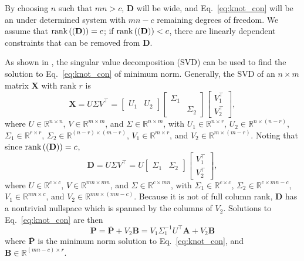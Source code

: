 By choosing $n$ such that $mn > c$, $\mathbf{D}$ will be wide, and Eq.~\ref{eq:knot_con} will be an under determined system with $mn - c$ remaining degrees of freedom.
We assume that $\text{rank}\left((\mathbf{D})\right) = c$; if $\text{rank}\left((\mathbf{D})\right) < c$, there are linearly dependent constraints that can be removed from $\mathbf{D}$.

As shown in \cite{MoonStirling00}, the singular value decomposition (SVD)
can be used to find the solution to Eq.~\ref{eq:knot_con} of minimum norm.
Generally, the SVD of an $n \times m$ matrix $\mathbf{X}$ with rank $r$ is 
\begin{equation}
	\mathbf{X} = U \Sigma V^\top = 
	\begin{bmatrix} U_1 & U_2 \end{bmatrix} 
	\begin{bmatrix} \Sigma_1 & \\ & \Sigma_2 \end{bmatrix} 
	\begin{bmatrix} V_1^\top \\ V_2^\top \end{bmatrix},
	\label{eq:D_svd}
\end{equation}
where $U \in \mathbb{R}^{n \times n}$, $V \in \mathbb{R}^{m \times m}$, and $\Sigma \in \mathbb{R}^{n \times m}$, with
$U_1 \in \mathbb{R}^{n \times r}$, $U_2 \in \mathbb{R}^{n \times (n-r)}$,
$\Sigma_1 \in \mathbb{R}^{r \times r}$, $\Sigma_2 \in \mathbb{R}^{(n-r) \times (m-r)}$,
$V_1 \in \mathbb{R}^{m \times r}$, and $V_2 \in \mathbb{R}^{m \times (m-r)}$.
Noting that since $\text{rank}\left((\mathbf{D})\right) = c$, 
\begin{equation}
	\mathbf{D} = U \Sigma V^\top = 
	U 
	\begin{bmatrix} \Sigma_1 & \Sigma_2 \end{bmatrix} 
	\begin{bmatrix} V_1^\top \\ V_2^\top \end{bmatrix},
	\label{eq:D_svd}
\end{equation}
where $U \in \mathbb{R}^{c \times c}$, $V \in \mathbb{R}^{mn \times mn}$, and $\Sigma \in \mathbb{R}^{c \times mn}$, with
$\Sigma_1 \in \mathbb{R}^{c \times c}$, $\Sigma_2 \in \mathbb{R}^{c \times mn-c}$,
$V_1 \in \mathbb{R}^{mn \times c}$, and $V_2 \in \mathbb{R}^{mn \times (mn-c)}$.
Because it is not of full column rank, $\mathbf{D}$ has a nontrivial nullspace which is spanned by the columns of $V_2$.
Solutions to Eq.~\ref{eq:knot_con} are then
\begin{equation}
	\label{eq:P_svd_sol}
	\mathbf{P} = \bar{\mathbf{P}} + V_2 \mathbf{B} = V_1 \Sigma_1^{-1} U^\top \mathbf{A} + V_2 \mathbf{B}
\end{equation}
where $\bar{\mathbf{P}}$ is the minimum norm solution to Eq.~\ref{eq:knot_con}, and $\mathbf{B} \in \mathbb{R}^{(mn-c) \times r}$.

